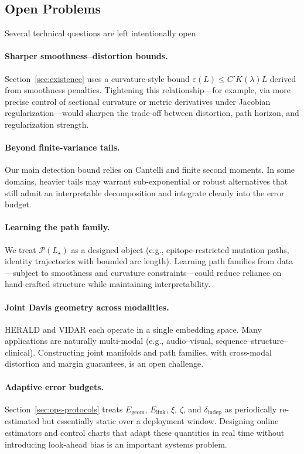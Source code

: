 \documentclass[11pt]{article}
\begin{document}
\subsection{Open Problems}
\label{subsec:open-problems}

Several technical questions are left intentionally open.

\paragraph{Sharper smoothness--distortion bounds.}
Section~\ref{sec:existence} uses a curvature-style bound $\varepsilon(L) \le C'K(\lambda)L$ derived
from smoothness penalties. Tightening this relationship---for example, via more precise control of
sectional curvature or metric derivatives under Jacobian regularization---would sharpen the trade-off
between distortion, path horizon, and regularization strength.

\paragraph{Beyond finite-variance tails.}
Our main detection bound relies on Cantelli and finite second moments. In some domains, heavier
tails may warrant sub-exponential or robust alternatives that still admit an interpretable decomposition
and integrate cleanly into the error budget.

\paragraph{Learning the path family.}
We treat $\mathcal{P}(L_\star)$ as a designed object (e.g., epitope-restricted mutation paths,
identity trajectories with bounded arc length). Learning path families from data---subject to
smoothness and curvature constraints---could reduce reliance on hand-crafted structure while
maintaining interpretability.

\paragraph{Joint Davis geometry across modalities.}
HERALD and VIDAR each operate in a single embedding space. Many applications are naturally
multi-modal (e.g., audio--visual, sequence--structure--clinical). Constructing joint manifolds and
path families, with cross-modal distortion and margin guarantees, is an open challenge.

\paragraph{Adaptive error budgets.}\label{sec:error-budgets}
Section~\ref{sec:ops-protocols} treats $E_{\mathrm{geom}}$, $E_{\mathrm{link}}$, $\xi$, $\zeta$, and
$\delta_{\mathrm{indep}}$ as periodically re-estimated but essentially static over a deployment window.
Designing online estimators and control charts that adapt these quantities in real time without
introducing look-ahead bias is an important systems problem.
\end{document}
